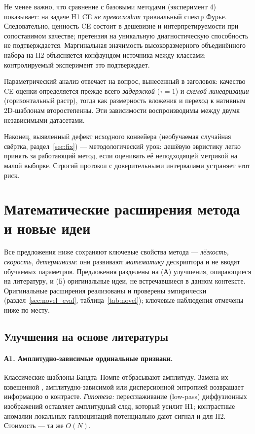 \documentclass[14pt]{extarticle}
\theoremstyle{plain}
\numberwithin{equation}{section}
\numberwithin{figure}{section}
\numberwithin{table}{section}
\begin{document}
Не менее важно, что сравнение с базовыми методами (эксперимент 4) показывает: на задаче H1
CE \emph{не превосходит} тривиальный спектр Фурье. Следовательно, ценность CE
состоит в дешевизне и интерпретируемости при сопоставимом качестве; претензия на
уникальную диагностическую способность не подтверждается. Маргинальная значимость
высокоразмерного объединённого набора на H2 объясняется конфаундом источника
между классами; контролируемый эксперимент это подтверждает.

Параметрический анализ отвечает на вопрос, вынесенный в заголовок: качество
CE-оценки определяется прежде всего \emph{задержкой} ($\tau=1$) и \emph{схемой
линеаризации} (горизонтальный растр), тогда как размерность вложения и переход к
нативным 2D-шаблонам второстепенны. Эти зависимости воспроизводимы между двумя
независимыми датасетами.

Наконец, выявленный дефект исходного конвейера (необучаемая случайная свёртка,
раздел~\ref{sec:fix}) — методологический урок: дешёвую эвристику легко принять за
работающий метод, если оценивать её неподходящей метрикой на малой выборке. Строгий
протокол с доверительными интервалами устраняет этот риск.

\section{Математические расширения метода и новые идеи}\label{sec:extensions}

Все предложения ниже сохраняют ключевые свойства метода — \emph{лёгкость,
скорость, детерминизм}: они развивают \emph{математику} дескриптора и не вводят
обучаемых параметров. Предложения разделены на (А) улучшения, опирающиеся на
литературу, и (Б) оригинальные идеи, не встречавшиеся в данном контексте.
Оригинальные расширения реализованы и проверены эмпирически
(раздел~\ref{sec:novel_eval}, таблица~\ref{tab:novel}); ключевые наблюдения
отмечены ниже по месту.

\subsection{Улучшения на основе литературы}

\paragraph{А1. Амплитудно-зависимые ординальные признаки.}
Классические шаблоны Бандта–Помпе отбрасывают амплитуду. Замена их взвешенной
\citep{fadlallah2013weighted}, амплитудно-зависимой \citep{azami2016amplitude} или
дисперсионной \citep{rostaghi2016dispersion} энтропией возвращает информацию о
контрасте. \emph{Гипотеза:} пересглаживание (low-pass) диффузионных изображений
оставляет амплитудный след, который усилит H1; контраст­ные аномалии локальных
галлюцинаций потенциально дают сигнал и для H2. Стоимость — та же $O(N)$.
\end{document}
